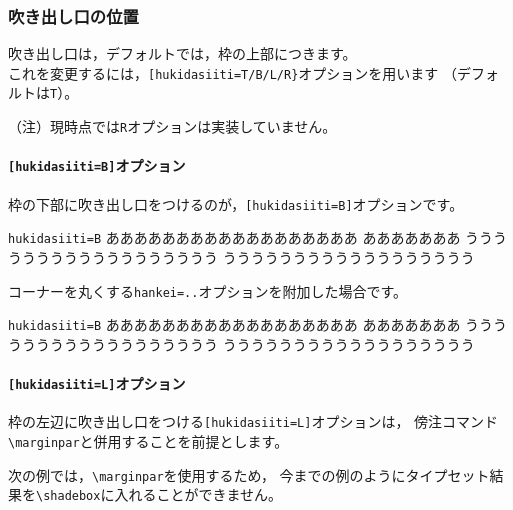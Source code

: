 \subsubsection{吹き出し口の位置}
吹き出し口は，デフォルトでは，枠の上部につきます。\\
これを変更するには，\verb+[hukidasiiti=T/B/L/R}+オプションを用います
（デフォルトは\verb+T+）。

（注）現時点では\verb+R+オプションは実装していません。

\paragraph{\texttt{[hukidasiiti=B]}オプション}
枠の下部に吹き出し口をつけるのが，\texttt{[hukidasiiti=B]}オプションです。

\begin{showEx}{\texttt{hukidasiiti=B}}
ああああああああああああああああああ
あああああああ%
%
うううううううううううううううううう
うううううううううううううううううう
\end{showEx}

コーナーを丸くする\verb+hankei=..+オプションを附加した場合です。

\begin{showEx}{\texttt{hukidasiiti=B}}
ああああああああああああああああああ
あああああああ%
%
うううううううううううううううううう
うううううううううううううううううう
\end{showEx}

\paragraph{\texttt{[hukidasiiti=L]}オプション}
枠の左辺に吹き出し口をつける\texttt{[hukidasiiti=L]}オプションは，
傍注コマンド\verb+\marginpar+と併用することを前提とします。

次の例では，\verb+\marginpar+を使用するため，
今までの例のようにタイプセット結果を\verb+\shadebox+に入れることができません。

